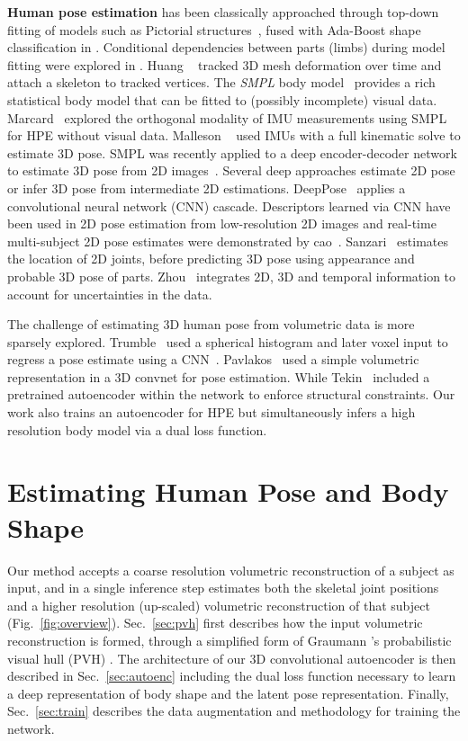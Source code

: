 \documentclass[runningheads]{llncs}
\begin{document}
{\bf Human pose estimation} has been classically approached through top-down fitting of models such as Pictorial structures~\cite{felzen03}, fused with Ada-Boost shape classification in \cite{andriluka09}.  Conditional dependencies between parts (limbs) during model fitting were explored in \cite{lan05,jiang09}.  Huang ~\cite{Huang2015} tracked 3D mesh deformation over time and attach a skeleton to tracked vertices.  The \emph{SMPL} body model~\cite{loper2015SMPL} provides a rich statistical body model that can be fitted to (possibly incomplete) visual data.  Marcard~\cite{SIP2017EG} explored the orthogonal modality of IMU measurements using SMPL for HPE without visual data. Malleson ~\cite{Malleson3DV17} used IMUs with a full kinematic solve to estimate 3D pose.  SMPL was recently applied to a deep encoder-decoder network to estimate 3D pose from 2D images~\cite{TanSMPLY2d3DBMVC17}.  Several deep approaches estimate 2D pose or infer 3D pose from intermediate 2D estimations.  DeepPose~\cite{Toshev2014} applies a convolutional neural network (CNN) cascade.  Descriptors learned via CNN have been used in 2D pose estimation from low-resolution 2D images \cite{Park2015} and real-time multi-subject 2D pose estimates were demonstrated by cao~\cite{cao2016realtimeCPM}. Sanzari~\cite{sanzari2016bayesianH36m} estimates the location of 2D joints, before predicting 3D pose using appearance and probable 3D pose of parts. Zhou~\cite{zhou2016sparsenessH36m} integrates 2D, 3D and temporal information to account for uncertainties in the data. 

The challenge of estimating 3D human pose from volumetric data is more sparsely explored. Trumble~\cite{TrumbleCVMP2DConvNet} used a spherical histogram and later voxel input to regress a pose estimate using a CNN~\cite{trumble_total_2017}. Pavlakos~\cite{pavlakos2017volumetricCVPR} used a simple volumetric representation in a 3D convnet for pose estimation. While Tekin~\cite{tekin2016structured} included a pretrained autoencoder within the network to enforce structural constraints.  Our work also trains an autoencoder for HPE but simultaneously infers a high resolution body model via a dual loss function.


\squeezeup
\section{Estimating Human Pose and Body Shape}
\squeezeup

Our method accepts a coarse resolution volumetric reconstruction of a subject as input, and in a single inference step estimates both the skeletal joint positions and a higher resolution (up-scaled) volumetric reconstruction of that subject (Fig.~\ref{fig:overview}).  Sec.~\ref{sec:pvh} first describes how the input volumetric reconstruction is formed, through a simplified form of Graumann 's probabilistic visual hull (PVH) \cite{Grauman2003}.  The architecture of our 3D convolutional autoencoder is then described in Sec.~\ref{sec:autoenc} including the dual loss function necessary to learn a deep representation of body shape and the latent pose representation.  Finally, Sec.~\ref{sec:train} describes the data augmentation and methodology for training the network. 
\end{document}
